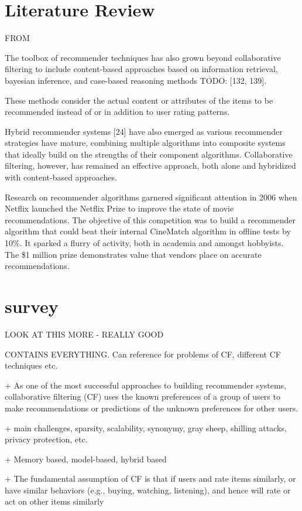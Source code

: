 
\section{Literature Review}

FROM \cite{schafer2007collaborative}


The toolbox of recommender techniques has also grown beyond
collaborative filtering to include content-based approaches based on
information retrieval, bayesian inference, and case-based reasoning
methods
TODO: [132, 139].

These methods consider the actual content or attributes of the items to be recommended instead of or in addition to user rating patterns. 

Hybrid recommender systems [24] have also emerged as various recommender strategies have mature, combining multiple algorithms into composite systems that ideally build on the strengths of their component algorithms. Collaborative filtering, however,
has remained an effective approach, both alone and hybridized
with content-based approaches.

Research on recommender algorithms garnered significant attention in 2006 when Netflix launched the Netflix Prize to improve the state of movie recommendations. The objective of this competition was to build a recommender algorithm that could beat their internal CineMatch algorithm in offline tests by 10\%. It sparked a flurry of activity, both in academia and amongst hobbyists. The \$1 million prize demonstrates value that vendors place on accurate recommendations. 

\section{survey}
\cite{survey}
LOOK AT THIS MORE - REALLY GOOD

CONTAINS EVERYTHING. Can reference for problems of CF, different CF techniques etc.

+ As one of the most successful approaches to building recommender systems, collaborative filtering (CF) uses the known preferences of a group of users to make recommendations or predictions of the unknown preferences for other users.

+ main challenges, sparsity, scalability, synonymy, gray sheep, shilling attacks, privacy protection, etc.

+ Memory based, model-based, hybrid based

+ The fundamental assumption of CF is that if users  and  rate  items similarly, or have similar behaviors (e.g., buying, watching, listening), and hence will rate or act on other items similarly \cite{goldberg}

